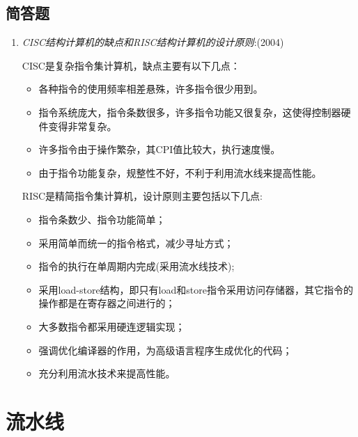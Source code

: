 \documentclass[a4paper]{ctexart}
\begin{document}
\subsection{简答题}
\begin{enumerate}
  \item {\color{grey}\emph{CISC结构计算机的缺点和RISC结构计算机的设计原则}:(2004)
  
    CISC是复杂指令集计算机，缺点主要有以下几点：
    \begin{itemize}
      \item 各种指令的使用频率相差悬殊，许多指令很少用到。
      \item 指令系统庞大，指令条数很多，许多指令功能又很复杂，这使得控制器硬件变得非常复杂。
      \item 许多指令由于操作繁杂，其CPI值比较大，执行速度慢。
      \item 由于指令功能复杂，规整性不好，不利于利用流水线来提高性能。
    \end{itemize}
    
    RISC是精简指令集计算机，设计原则主要包括以下几点:
    \begin{itemize}
      \item 指令条数少、指令功能简单；
      \item 采用简单而统一的指令格式，减少寻址方式；
      \item 指令的执行在单周期内完成(采用流水线技术);
      \item 采用load-store结构，即只有load和store指令采用访问存储器，其它指令的操作都是在寄存器之间进行的；
      \item 大多数指令都采用硬连逻辑实现；
      \item 强调优化编译器的作用，为高级语言程序生成优化的代码；
      \item 充分利用流水技术来提高性能。
    \end{itemize}
  }
\end{enumerate}

\newpage
\section{流水线}
\end{document}
